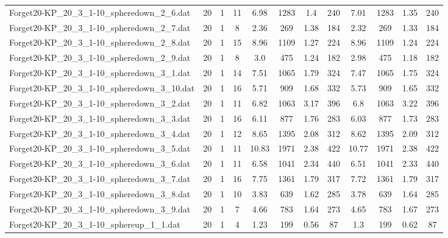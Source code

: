 \begin{sidewaystable}[!ht]
{\begin{tabular}{lccccccccccc}
Forget20-KP\_20\_3\_1-10\_spheredown\_2\_6.dat & 20 & 1 & 11 & 6.98 & 1283 & 1.4 & 240 & 7.01 & 1283 &  \textcolor{blue2}{1.35} & 240 \\
Forget20-KP\_20\_3\_1-10\_spheredown\_2\_7.dat & 20 & 1 & 8 & 2.36 & 269 & 1.38 & 184 & 2.32 & 269 &  \textcolor{blue2}{1.33} & 184 \\
Forget20-KP\_20\_3\_1-10\_spheredown\_2\_8.dat & 20 & 1 & 15 & 8.96 & 1109 & 1.27 & 224 & 8.96 & 1109 & 1.24 & 224 \\
Forget20-KP\_20\_3\_1-10\_spheredown\_2\_9.dat & 20 & 1 & 8 & 3.0 & 475 & 1.24 & 182 & 2.98 & 475 &  \textcolor{blue2}{1.18} & 182 \\
Forget20-KP\_20\_3\_1-10\_spheredown\_3\_1.dat & 20 & 1 & 14 & 7.51 & 1065 & 1.79 & 324 & 7.47 & 1065 &  \textcolor{blue2}{1.75} & 324 \\
Forget20-KP\_20\_3\_1-10\_spheredown\_3\_10.dat & 20 & 1 & 16 & 5.71 & 909 & 1.68 & 332 & 5.73 & 909 &  \textcolor{blue2}{1.65} & 332 \\
Forget20-KP\_20\_3\_1-10\_spheredown\_3\_2.dat & 20 & 1 & 11 & 6.82 & 1063 &  \textcolor{blue2}{3.17} & 396 & 6.8 & 1063 & 3.22 & 396 \\
Forget20-KP\_20\_3\_1-10\_spheredown\_3\_3.dat & 20 & 1 & 16 & 6.11 & 877 & 1.76 & 283 & 6.03 & 877 &  \textcolor{blue2}{1.73} & 283 \\
Forget20-KP\_20\_3\_1-10\_spheredown\_3\_4.dat & 20 & 1 & 12 & 8.65 & 1395 &  \textcolor{blue2}{2.08} & 312 & 8.62 & 1395 & 2.09 & 312 \\
Forget20-KP\_20\_3\_1-10\_spheredown\_3\_5.dat & 20 & 1 & 11 & 10.83 & 1971 &  \textcolor{blue2}{2.38} & 422 & 10.77 & 1971 &  \textcolor{blue2}{2.38} & 422 \\
Forget20-KP\_20\_3\_1-10\_spheredown\_3\_6.dat & 20 & 1 & 11 & 6.58 & 1041 & 2.34 & 440 & 6.51 & 1041 &  \textcolor{blue2}{2.33} & 440 \\
Forget20-KP\_20\_3\_1-10\_spheredown\_3\_7.dat & 20 & 1 & 16 & 7.75 & 1361 &  \textcolor{blue2}{1.79} & 317 & 7.72 & 1361 &  \textcolor{blue2}{1.79} & 317 \\
Forget20-KP\_20\_3\_1-10\_spheredown\_3\_8.dat & 20 & 1 & 10 & 3.83 & 639 &  \textcolor{blue2}{1.62} & 285 & 3.78 & 639 & 1.64 & 285 \\
Forget20-KP\_20\_3\_1-10\_spheredown\_3\_9.dat & 20 & 1 & 7 & 4.66 & 783 &  \textcolor{blue2}{1.64} & 273 & 4.65 & 783 & 1.67 & 273 \\
Forget20-KP\_20\_3\_1-10\_sphereup\_1\_1.dat & 20 & 1 & 4 & 1.23 & 199 &  \textcolor{blue2}{0.56} & 87 & 1.3 & 199 & 0.62 & 87 \\

\end{tabular}}
\end{sidewaystable}
